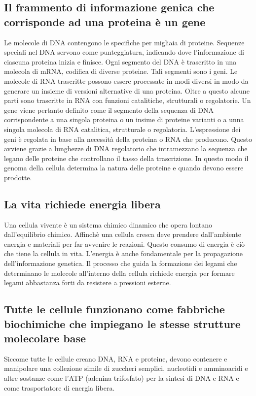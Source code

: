 \subsection{Il frammento di informazione genica che corrisponde ad una proteina \`e un gene}
Le molecole di DNA contengono le specifiche per migliaia di proteine. Sequenze speciali nel DNA servono come punteggiatura, indicando dove l'informazione di ciascuna proteina inizia e
finisce. Ogni segmento del DNA \`e trascritto in una molecola di mRNA, codifica di diverse proteine. Tali segmenti sono i geni. Le molecole di RNA trascritte possono essere processate
in modi diversi in modo da generare un insieme di versioni alternative di una proteina. Oltre a questo alcune parti sono trascritte in RNA con funzioni catalitiche, strutturali o 
regolatorie. Un gene viene pertanto definito come il segmento della sequenza di DNA corrispondente a una singola proteina o un insime di proteine varianti o a unna singola molecola di 
RNA catalitica, strutturale o regolatoria. L'espressione dei geni \`e regolata in base alla necessit\`a della proteina o RNA che producono. Questo avviene grazie a lunghezze di DNA
regolatorio che intramezzano la sequenza che legano delle proteine che controllano il tasso della trascrizione. In questo modo il genoma della cellula determina la natura delle proteine e
quando devono essere prodotte.
\subsection{La vita richiede energia libera}
Una cellula vivente \`e un sistema chimico dinamico che opera lontano dall'equilibrio chimico. Affinch\`e una cellula cresca deve prendere dall'ambiente energia e materiali per far
avvenire le reazioni. Questo consumo di energia \`e ci\`o che tiene la cellula in vita. L'energia \`e anche fondamentale per la propagazione dell'informazione genetica. Il processo che
guida la formazione dei legami che determinano le molecole all'interno della cellula richiede energia per formare legami abbastanza forti da resistere a pressioni esterne. 
\subsection{Tutte le cellule funzionano come fabbriche biochimiche che impiegano le stesse strutture molecolare base}
Siccome tutte le cellule creano DNA, RNA e proteine, devono contenere e manipolare una collezione simile di zuccheri semplici, nucleotidi e amminoacidi e altre sostanze come l'ATP 
(adenina trifosfato) per la sintesi di DNA e RNA e come trasportatore di energia libera. 
